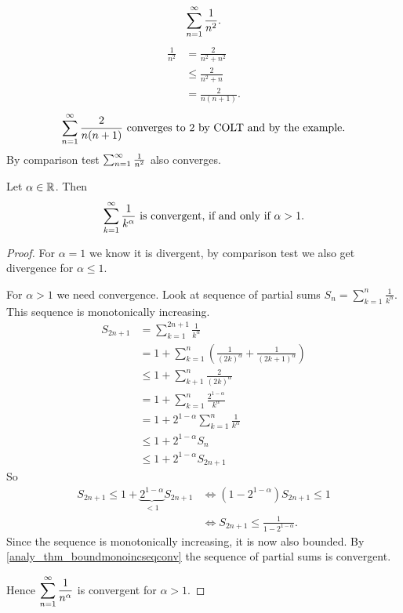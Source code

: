 \documentclass[10pt, a4paper]{article}
\begin{document}
\begin{example}
    \[
    \infsum[n = 1]\frac{1}{n ^ 2}.
    \]
    \begin{align*}
        \frac{1}{n ^ 2} &= \frac{2}{n ^ 2 + n ^ 2} \\
        &\leq \frac{2}{n ^ 2 + n} \\
        &= \frac{2}{n(n + 1)}.
    \end{align*}
    \[
    \infsum[n = 1]\frac{2}{n(n + 1)}\text{ converges to $2$ by COLT and by the example}.
    \]
    By comparison test $\infsum[n = 1]\frac{1}{n ^ 2}$ also converges.
\end{example}

\begin{theorem}
    Let $\alpha \in \R$.
    Then
    \[
    \infsum\frac{1}{k ^ \alpha}\text{ is convergent, if and only if $\alpha > 1$}.
    \]
    \begin{proof}
        For $\alpha = 1$ we know it is divergent,
        by comparison test we also get divergence for $\alpha \leq 1$.

        For $\alpha > 1$ we need convergence.
        Look at sequence of partial sums $\displaystyle S_n = \sum_{k = 1}^{n}\frac{1}{k ^ \alpha}$.
        This sequence is monotonically increasing.
        \begin{align*}
            S_{2n + 1} &= \sum_{k = 1}^{2n + 1}\frac{1}{k ^ \alpha} \\
            &= 1 + \sum_{k = 1}^{n}\left(\frac{1}{(2k) ^ \alpha} + \frac{1}{(2k + 1) ^ \alpha}\right) \\
            &\leq 1 + \sum_{k + 1}^{n}\frac{2}{(2k) ^ \alpha} \\
            &= 1 + \sum_{k = 1}^{n}\frac{2 ^ {1 - \alpha}}{k ^ \alpha} \\
            &= 1 + 2 ^ {1 - \alpha}\sum_{k = 1}^{n}\frac{1}{k ^ \alpha} \\
            &\leq 1 + 2 ^ {1 - \alpha}S_n \\
            &\leq 1 + 2 ^ {1 - \alpha}S_{2n + 1}
        \end{align*}
        So
        \begin{align*}
            S_{2n + 1} \leq 1 + \underbrace{2 ^ {1 - \alpha}}_{< 1}S_{2n + 1} &\iff (1 - 2 ^ {1 - \alpha})S_{2n + 1} \leq 1 \\
            &\iff S_{2n + 1} \leq \frac{1}{1 - 2 ^ {1 - \alpha}}.
        \end{align*}
        Since the sequence is monotonically increasing,
        it is now also bounded.
        By \autoref{analy_thm_boundmonoincseqconv} the sequence of partial sums is convergent.
        
        Hence $\displaystyle\infsum[n = 1]\frac{1}{n ^ \alpha}$ is convergent for $\alpha > 1$.
    \end{proof}
\end{theorem}
\end{document}
